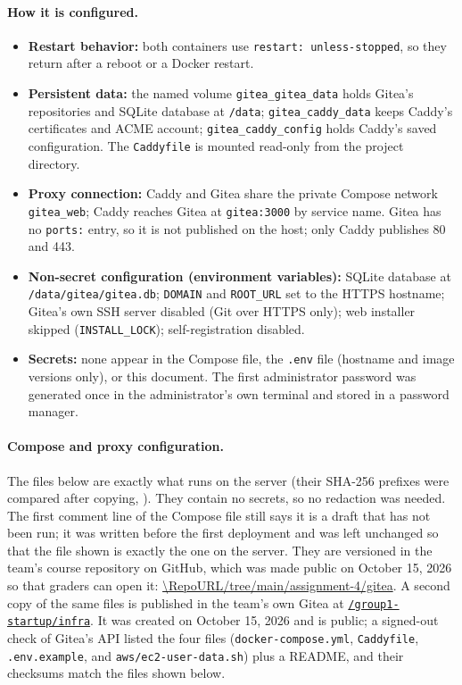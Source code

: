 \paragraph{How it is configured.}
\begin{itemize}[nosep]
  \item \textbf{Restart behavior:} both containers use \texttt{restart: unless-stopped}, so they return after a reboot or a Docker restart.
  \item \textbf{Persistent data:} the named volume \texttt{gitea\_gitea\_data} holds Gitea's repositories and SQLite database at \texttt{/data}; \texttt{gitea\_caddy\_data} keeps Caddy's certificates and ACME account; \texttt{gitea\_caddy\_config} holds Caddy's saved configuration. The \texttt{Caddyfile} is mounted read-only from the project directory.
  \item \textbf{Proxy connection:} Caddy and Gitea share the private Compose network \texttt{gitea\_web}; Caddy reaches Gitea at \texttt{gitea:3000} by service name. Gitea has no \texttt{ports:} entry, so it is not published on the host; only Caddy publishes 80 and 443.
  \item \textbf{Non-secret configuration (environment variables):} SQLite database at \texttt{/data/gitea/gitea.db}; \texttt{DOMAIN} and \texttt{ROOT\_URL} set to the HTTPS hostname; Gitea's own SSH server disabled (Git over HTTPS only); web installer skipped (\texttt{INSTALL\_LOCK}); self-registration disabled.
  \item \textbf{Secrets:} none appear in the Compose file, the \texttt{.env} file (hostname and image versions only), or this document. The first administrator password was generated once in the administrator's own terminal and stored in a password manager.
\end{itemize}

\paragraph{Compose and proxy configuration.}
The files below are exactly what runs on the server (their SHA-256 prefixes
were compared after copying, ). They contain no secrets, so no
redaction was needed. The first comment line of the Compose file still says it is a draft that has not been run; it was written before the first deployment and was left unchanged so that the file shown is exactly the one on the server. They are versioned in the team's course repository on
GitHub, which was made public on October 15, 2026 so that graders can open it:
\url{\RepoURL/tree/main/assignment-4/gitea}. A second copy of the same files is
published in the team's own Gitea at
\href{\GiteaURL/group1-startup/infra}{\texttt{\GiteaURL/group1-startup/infra}}.
It was created on October 15, 2026 and is public; a signed-out check of Gitea's
API listed the four files (\texttt{docker-compose.yml}, \texttt{Caddyfile},
\texttt{.env.example}, and \texttt{aws/ec2-user-data.sh}) plus a README, and their
checksums match the files shown below.

